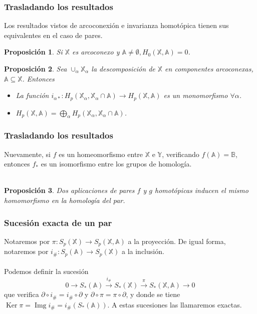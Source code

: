 \documentclass{beamer}
\def\X{{\mathbb X}}
\def\A{{\mathbb A}}
\def\Y{{\mathbb Y}}
\def\B{{\mathbb B}}
\DeclareMathOperator{\Ker}{Ker}
\DeclareMathOperator{\Img}{Img}
\theoremstyle{theorem}
\newtheorem{myproposition}{Proposición}
\begin{document}
\begin{frame}
  \frametitle{Trasladando los resultados}
  Los resultados vistos de arcoconexión e invarianza homotópica tienen sus equivalentes en el caso de pares.

  \begin{myproposition}
    Si $\X$ es arcoconexo y $\A \neq \emptyset, H_0(\X, \A) = 0$.
  \end{myproposition}

  \begin{myproposition}
    Sea $\cup_\alpha \X_\alpha$ la descomposición de $\X$ en componentes arcoconexas, $\A \subseteq \X$. Entonces
    \begin{itemize}
      \item[a)] La función $i_{\alpha *} \colon H_p(\X_\alpha, \X_\alpha \cap \A) \to H_p(\X, \A)$ es un monomorfismo $\forall \alpha$.
      \item[b)] $H_p(\X, \A) = \bigoplus_\alpha H_p(\X_\alpha, \X_\alpha \cap \A)$.
    \end{itemize}
  \end{myproposition}


\end{frame}


\begin{frame}
  \frametitle{Trasladando los resultados}

  Nuevamente, si $f$ es un homeomorfismo entre $\X$ e $\Y$, verificando $f(\A) = \B$, entonces $f_*$
  es un isomorfismo entre los grupos de homología. \\~\\

  \begin{myproposition}
    Dos aplicaciones de pares $f$ y $g$ homotópicas inducen el mismo homomorfismo en la homología del par.
  \end{myproposition}


\end{frame}


\begin{frame}
  \frametitle{Sucesión exacta de un par}
  Notaremos por $\pi \colon S_p(\X) \to S_p(\X, \A)$ a la proyección. De igual forma, notaremos por
  $i_\# \colon S_p(\A) \to S_p(\X)$ a la inclusión. \\~\\

  Podemos definir la sucesión
  \[ 0 \to S_*(\A) \xrightarrow{i_\#} S_*(\X) \xrightarrow{\pi} S_*(\X, \A) \to 0 \]
  que verifica $\partial \circ i_\# = i_\# \circ \partial$ y $\partial \circ \pi = \pi \circ \partial$,
  y donde se tiene $\Ker \pi = \Img i_\# = i_\#(S_*(\A))$. A estas sucesiones las llamaremos exactas.

\end{frame}
\end{document}
